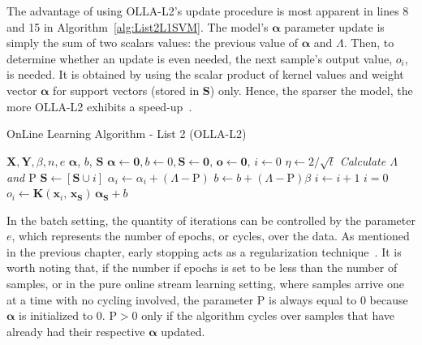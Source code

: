 \documentclass[reqno]{vcuthesis}
\newcommand{\Rho}{\mathrm{P}}
\numberwithin{equation}{chapter}
\begin{document}
The advantage of using OLLA-L2's update procedure is most apparent in lines 8 and 15 in Algorithm~\ref{alg:List2L1SVM}. The model's $\bm \alpha$ parameter update is simply the sum of two scalars values: the previous value of $\bm \alpha$ and $\Lambda$. Then, to determine whether an update is even needed, the next sample's output value, $o_i$, is needed. It is obtained by using the scalar product of kernel values and weight vector $\bm \alpha$ for support vectors (stored in $\bm S$) only. Hence, the sparser the model, the more OLLA-L2 exhibits a speed-up~\cite{kecman2016fast}. 
\begin{algorithm}[t!]
\centering \small
\caption{OnLine Learning Algorithm - List 2 (OLLA-L2)}
\label{alg:List2L1SVM} 
\begin{algorithmic}[1]
\renewcommand{\algorithmicrequire}{\textbf{Input:}}
\renewcommand{\algorithmicensure}{\textbf{Output:}}
\Require $\bm X, \bm Y, \beta, n, e$
\Ensure  $\bm \alpha$, $b$, $\bm S$
\State $\bm \alpha \leftarrow \bm 0, b \leftarrow 0, \bm S \leftarrow \bm 0,\, \bm o \leftarrow \bm 0,\, i \leftarrow 0$ 
\State $\eta \leftarrow 2/\sqrt{t}$ 
 
\State \textit{Calculate $\Lambda$ and $\Rho$} 
\State $\bm S \leftarrow [\bm S \cup i]$ 
\State $\alpha_i \leftarrow \alpha_i + (\Lambda - \Rho)$ 
\State $b \leftarrow b + (\Lambda - \Rho)\beta$ 
\EndIf
\State $i \leftarrow i + 1$ 
 
\State $i = 0$ 
\EndIf
\State $o_i \leftarrow \bm{K}(\bm x_i,\, \bm x_{\bm S})\, \bm \alpha_{\bm S} + b$ 
\EndFor
\end{algorithmic} 
\end{algorithm}

In the batch setting, the quantity of iterations can be controlled by the parameter $e$, which represents the number of epochs, or cycles, over the data. As mentioned in the previous chapter, early stopping acts as a regularization technique~\cite{collobert2004links}. It is worth noting that, if the number if epochs is set to be less than the number of samples, or in the pure online stream learning setting, where samples arrive one at a time with no cycling involved, the parameter $\Rho$ is always equal to 0 because $\bm \alpha$ is initialized to 0. $\Rho > 0$ only if the algorithm cycles over samples that have already had their respective $\bm \alpha$ updated.
\end{document}
